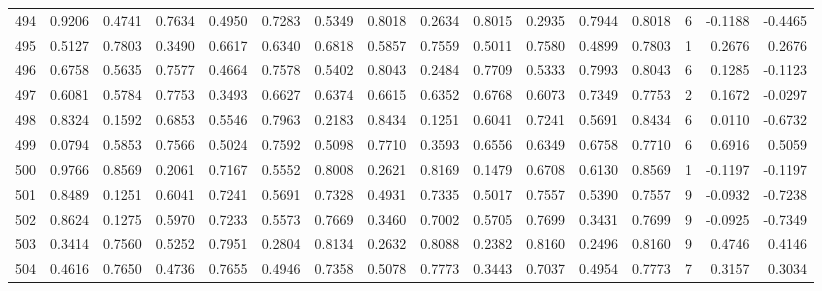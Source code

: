 \begin{tabular}{lrrrrrrrrrrrrrrr}
494 &      0.9206 &  0.4741 &  0.7634 &  0.4950 &  0.7283 &  0.5349 &  0.8018 &  0.2634 &  0.8015 &  0.2935 &   0.7944 &     0.8018 &      6 &                   -0.1188 &                    -0.4465 \\
495 &      0.5127 &  0.7803 &  0.3490 &  0.6617 &  0.6340 &  0.6818 &  0.5857 &  0.7559 &  0.5011 &  0.7580 &   0.4899 &     0.7803 &      1 &                    0.2676 &                     0.2676 \\
496 &      0.6758 &  0.5635 &  0.7577 &  0.4664 &  0.7578 &  0.5402 &  0.8043 &  0.2484 &  0.7709 &  0.5333 &   0.7993 &     0.8043 &      6 &                    0.1285 &                    -0.1123 \\
497 &      0.6081 &  0.5784 &  0.7753 &  0.3493 &  0.6627 &  0.6374 &  0.6615 &  0.6352 &  0.6768 &  0.6073 &   0.7349 &     0.7753 &      2 &                    0.1672 &                    -0.0297 \\
498 &      0.8324 &  0.1592 &  0.6853 &  0.5546 &  0.7963 &  0.2183 &  0.8434 &  0.1251 &  0.6041 &  0.7241 &   0.5691 &     0.8434 &      6 &                    0.0110 &                    -0.6732 \\
499 &      0.0794 &  0.5853 &  0.7566 &  0.5024 &  0.7592 &  0.5098 &  0.7710 &  0.3593 &  0.6556 &  0.6349 &   0.6758 &     0.7710 &      6 &                    0.6916 &                     0.5059 \\
500 &      0.9766 &  0.8569 &  0.2061 &  0.7167 &  0.5552 &  0.8008 &  0.2621 &  0.8169 &  0.1479 &  0.6708 &   0.6130 &     0.8569 &      1 &                   -0.1197 &                    -0.1197 \\
501 &      0.8489 &  0.1251 &  0.6041 &  0.7241 &  0.5691 &  0.7328 &  0.4931 &  0.7335 &  0.5017 &  0.7557 &   0.5390 &     0.7557 &      9 &                   -0.0932 &                    -0.7238 \\
502 &      0.8624 &  0.1275 &  0.5970 &  0.7233 &  0.5573 &  0.7669 &  0.3460 &  0.7002 &  0.5705 &  0.7699 &   0.3431 &     0.7699 &      9 &                   -0.0925 &                    -0.7349 \\
503 &      0.3414 &  0.7560 &  0.5252 &  0.7951 &  0.2804 &  0.8134 &  0.2632 &  0.8088 &  0.2382 &  0.8160 &   0.2496 &     0.8160 &      9 &                    0.4746 &                     0.4146 \\
504 &      0.4616 &  0.7650 &  0.4736 &  0.7655 &  0.4946 &  0.7358 &  0.5078 &  0.7773 &  0.3443 &  0.7037 &   0.4954 &     0.7773 &      7 &                    0.3157 &                     0.3034 \\

\end{tabular}
